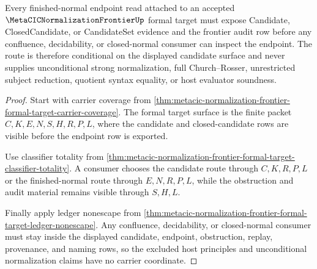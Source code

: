 \begin{theorem}
\label{thm:metacic-normalization-frontier-candidate-endpoint-premise-route}
Every finished-normal endpoint read attached to an accepted $\MetaCICNormalizationFrontierUp$ formal target must expose Candidate, ClosedCandidate, or CandidateSet evidence and the frontier audit row before any confluence, decidability, or closed-normal consumer can inspect the endpoint. The route is therefore conditional on the displayed candidate surface and never supplies unconditional strong normalization, full Church--Rosser, unrestricted subject reduction, quotient syntax equality, or host evaluator soundness.
\end{theorem}
\begin{proof}
Start with carrier coverage from \autoref{thm:metacic-normalization-frontier-formal-target-carrier-coverage}. The formal target surface is the finite packet $C,K,E,N,S,H,R,P,L$, where the candidate and closed-candidate rows are visible before the endpoint row is exported.

Use classifier totality from \autoref{thm:metacic-normalization-frontier-formal-target-classifier-totality}. A consumer chooses the candidate route through $C,K,R,P,L$ or the finished-normal route through $E,N,R,P,L$, while the obstruction and audit material remains visible through $S,H,L$.

Finally apply ledger nonescape from \autoref{thm:metacic-normalization-frontier-formal-target-ledger-nonescape}. Any confluence, decidability, or closed-normal consumer must stay inside the displayed candidate, endpoint, obstruction, replay, provenance, and naming rows, so the excluded host principles and unconditional normalization claims have no carrier coordinate.
\end{proof}
